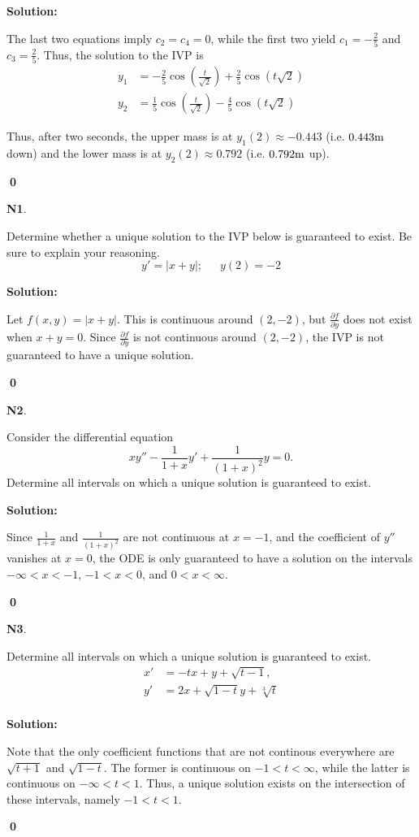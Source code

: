 \documentclass{article}
\newenvironment{problem}[1]
{
  \begin{flushleft}
  \textbf{#1}.
  \ignorespaces
}
{
  \end{flushleft}
}
\newenvironment{solution}
{
  \ignorespaces
  \textbf{Solution:}
}
{
  \ignorespacesafterend
  \begin{flushright}
  {\bfseries \qed}
  \end{flushright}
}
\begin{document}
\begin{solution}
The last two equations imply \(c_2=c_4=0\), while the first two yield \(c_1=-\frac{2}{5}\) and \(c_3 = \frac{2}{5}\).  Thus, the solution to the IVP is
\begin{align*}
y_1 &= -\frac{2}{5} \cos\left(\frac{t}{\sqrt{2}}\right)+\frac{2}{5}\cos\left(t\sqrt{2}\right) \\
y_2 &= \frac{1}{5} \cos\left(\frac{t}{\sqrt{2}}\right)-\frac{4}{5} \cos\left(t\sqrt{2}\right)
\end{align*}

Thus, after two seconds, the upper mass is at \(y_1(2) \approx -0.443\) (i.e. \(0.443 {\rm m}\) down) and the lower mass is at \(y_2(2) \approx 0.792\) (i.e. \(0.792 {\rm m}\) up).
\end{solution}


\begin{problem}{N1}
Determine whether a unique solution to the IVP below is guaranteed to exist.
Be sure to explain your reasoning.
\[
y' = |x+y|;\,\,\,\,\,\,\,\,\,y(2) = -2
\]
\end{problem}
\begin{solution}
Let \(f(x,y)=|x+y|\).  This is continuous around \((2,-2)\), but \(\frac{\partial f}{\partial y}\) does not exist when \(x+y=0\).  Since \(\frac{\partial f}{\partial y}\) is not continuous around \((2,-2)\), the IVP is not guaranteed to have a unique solution.
\end{solution}

\begin{problem}{N2}
Consider the differential equation
\[
xy'' - \frac{1}{1+x}y' + \frac{1}{(1+x)^2}y = 0.
\]
Determine all intervals on which a unique solution is guaranteed to exist.
\end{problem}
\begin{solution}
Since \(\frac{1}{1+x}\) and \(\frac{1}{(1+x)^2}\) are not continuous at \(x=-1\), and the coefficient of \(y''\) vanishes at \(x=0\), the ODE is only guaranteed to have a solution on the intervals \( -\infty <x<-1\), \(-1<x<0\), and \(0<x<\infty\).  
\end{solution}

\begin{problem}{N3}
Determine all intervals on which a unique solution is guaranteed to exist.
\begin{align*}
x' & = -tx+y + \sqrt{t-1},\\
y' & = 2x + \sqrt{1-t}y + \sqrt[3]{t}\\
\end{align*}
\end{problem}
\begin{solution}
Note that the only coefficient functions that are not continous everywhere are \(\sqrt{t+1}\) and \(\sqrt{1-t}\).  The former is continuous on \( -1<t<\infty\), while the latter is continuous on \(-\infty<t<1\).  Thus, a unique solution exists on the intersection of these intervals, namely \(-1<t<1\).
\end{solution}
\end{document}
